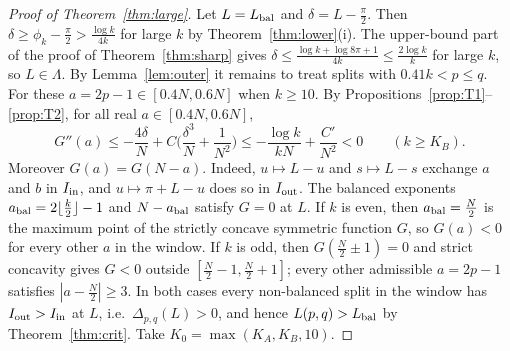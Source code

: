 \documentclass[11pt]{amsart}
\theoremstyle{definition}
\begin{document}
\begin{proof}[Proof of Theorem~\ref{thm:large}]
Let $L=L_{\rm bal}$ and $\delta=L-\frac\pi2$. Then $\delta\ge\phi_k-\frac\pi2>\frac{\log k}{4k}$ for large $k$ by Theorem~\ref{thm:lower}(i). The upper-bound part of the proof of
Theorem~\ref{thm:sharp} gives $\delta\le\frac{\log k+\log8\pi+1}{4k}\le\frac{2\log k}k$ for large $k$, so $L\in\Lambda$.
By Lemma~\ref{lem:outer} it remains to treat splits with $0.41k<p\le q$. For these $a=2p-1\in[0.4N,0.6N]$ when $k\ge10$.
By Propositions~\ref{prop:T1}--\ref{prop:T2}, for all real $a\in[0.4N,0.6N]$,
\[
G''(a)\le-\frac{4\delta}N+C\Big(\frac{\delta^3}N+\frac1{N^2}\Big)\le-\frac{\log k}{kN}+\frac{C'}{N^2}<0\qquad(k\ge K_B).
\]
Moreover $G(a)=G(N-a)$. Indeed, $u\mapsto L-u$ and $s\mapsto L-s$ exchange $a$ and $b$ in $I_{\rm in}$, and $u\mapsto\pi+L-u$ does so in $I_{\rm out}$.
The balanced exponents $a_{\rm bal}=2\lfloor\frac k2\rfloor-1$ and $N-a_{\rm bal}$ satisfy $G=0$ at $L$.
If $k$ is even, then $a_{\rm bal}=\frac N2$ is the maximum point of the strictly concave symmetric function $G$, so $G(a)<0$ for every other $a$ in the window.
If $k$ is odd, then $G(\frac N2\pm1)=0$ and strict concavity gives $G<0$ outside $[\frac N2-1,\frac N2+1]$; every other admissible $a=2p-1$ satisfies $|a-\frac N2|\ge3$.
In both cases every non-balanced split in the window has $I_{\rm out}>I_{\rm in}$ at $L$, i.e.\ $\Delta_{p,q}(L)>0$, and hence $L(p,q)>L_{\rm bal}$ by Theorem~\ref{thm:crit}.
Take $K_0=\max(K_A,K_B,10)$.
\end{proof}
\end{document}
